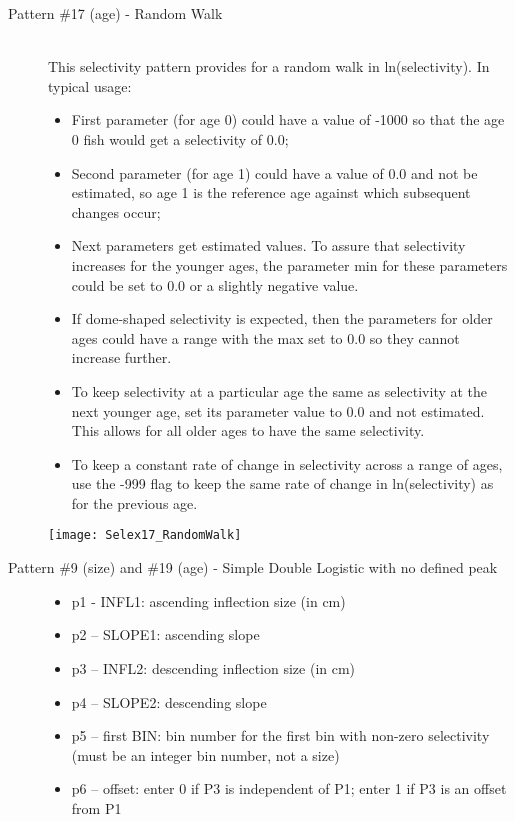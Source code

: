 \begin{description}
	\item[Pattern \#17 (age) - Random Walk]\hfill\\
	This selectivity pattern provides for a random walk in ln(selectivity).  In typical usage:
	\begin{itemize}
		\item First parameter (for age 0) could have a value of -1000 so that the age 0 fish would get a selectivity of 0.0;
		\item 	Second parameter (for age 1) could have a value of 0.0 and not be estimated, so age 1 is the reference age against which subsequent changes occur;
		\item 	Next parameters get estimated values.  To assure that selectivity increases for the younger ages, the parameter min for these parameters could be set to 0.0 or a slightly negative value.
		\item If dome-shaped selectivity is expected, then the parameters for older ages could have a range with the max set to 0.0 so they cannot increase further.
		\item To keep selectivity at a particular age the same as selectivity at the next younger age, set its parameter value to 0.0 and not estimated.  This allows for all older ages to have the same selectivity.
		\item 	To keep a constant rate of change in selectivity across a range of ages, use the -999 flag to keep the same rate of change in ln(selectivity) as for the previous age.
	\end{itemize}
	\begin{center}
		\texttt{[image: Selex17\_RandomWalk]}
	\end{center}
\end{description}

\begin{description}
	\item[Pattern \#9 (size) and \#19 (age) - Simple Double Logistic with no defined peak]\hfil
	\begin{itemize}
		\item p1 - INFL1:  ascending inflection size (in cm)
		\item p2 – SLOPE1:  ascending slope
		\item p3 – INFL2:  descending inflection size (in cm)
		\item p4 – SLOPE2:  descending slope
		\item p5 – first BIN: bin number for the first bin with non-zero selectivity (must be an integer bin number, not a size)
		\item p6 – offset:  enter 0 if P3 is independent of P1; enter 1 if P3 is an offset from P1
	\end{itemize}
\end{description}

